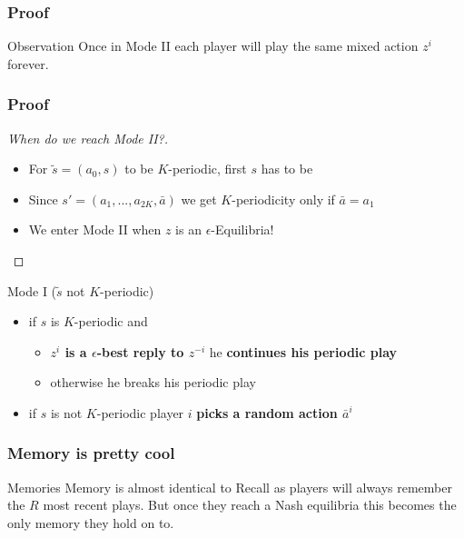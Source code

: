 \documentclass{beamer}
\begin{document}
\begin{frame}
    \frametitle{Proof}
    \begin{exampleblock}{Observation}
        Once in Mode II each player will play the same mixed action $z^i$ forever.
    \end{exampleblock}
\end{frame}

\begin{frame}
    \frametitle{Proof}
    \begin{proof}[When do we reach Mode II?\nopunct]
        \begin{itemize}
            \item<3-> For $\tilde{s} = (a_0, s)$ to be $K$-periodic, first $s$ has to be
            \item<5-> Since $s' = (a_{1}, ..., a_{2K}, \bar{a})$ we get $K$-periodicity only if $\bar{a} = a_1$
            \item<7- | alert@7> We enter Mode II when $z$ is an $\epsilon$-Equilibria! 
        \end{itemize}
    \end{proof}
    \pause
    \begin{exampleblock}{Mode I ($\tilde{s}$ not $K$-periodic)}
        \begin{itemize}
            \item if $s$ is $K$-periodic and 
                \begin{itemize}
                    \item \textbf<6>{$z^i$ is a $\epsilon$-best reply to $z^{-i}$}
                        he \textbf<5>{continues his periodic play}
                    \item otherwise he breaks his periodic play
                \end{itemize}
            \item if $s$ is not $K$-periodic player $i$ \textbf<4>{picks a random action $\bar{a}^i$}
        \end{itemize}
    \end{exampleblock}
\end{frame}

\begin{frame}
    \frametitle{Memory is pretty cool}
    \begin{exampleblock}{Memories}
        Memory is almost identical to Recall as players will always remember the $R$ most recent
        plays. But once they reach a Nash equilibria this becomes the only memory they hold on to.
    \end{exampleblock}
\end{frame}
\end{document}
